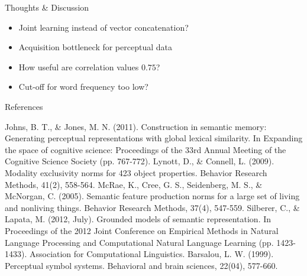 \documentclass[12pt,a4paper]{beamer}
\begin{document}
\begin{frame}{Thoughts \& Discussion}
\begin{itemize}
\item Joint learning instead of vector concatenation?
\item Acquisition bottleneck for perceptual data
\item How useful are correlation values $0.75$?
\item Cut-off for word frequency too low?
\end{itemize}
\end{frame}




\begin{frame}[allowframebreaks]{References}
\begin{thebibliography}{-}
 Johns, B. T., \& Jones, M. N. (2011). Construction in semantic memory: Generating perceptual representations with global lexical similarity. In Expanding the space of cognitive science: Proceedings of the 33rd Annual Meeting of the Cognitive Science Society (pp. 767-772).
 Lynott, D., \& Connell, L. (2009). Modality exclusivity norms for 423 object properties. Behavior Research Methods, 41(2), 558-564.
 McRae, K., Cree, G. S., Seidenberg, M. S., \& McNorgan, C. (2005). Semantic feature production norms for a large set of living and nonliving things. Behavior Research Methods, 37(4), 547-559.
 Silberer, C., \& Lapata, M. (2012, July). Grounded models of semantic representation. In Proceedings of the 2012 Joint Conference on Empirical Methods in Natural Language Processing and Computational Natural Language Learning (pp. 1423-1433). Association for Computational Linguistics.
 Barsalou, L. W. (1999). Perceptual symbol systems. Behavioral and brain sciences, 22(04), 577-660.
\end{thebibliography}
\end{frame}
\end{document}
